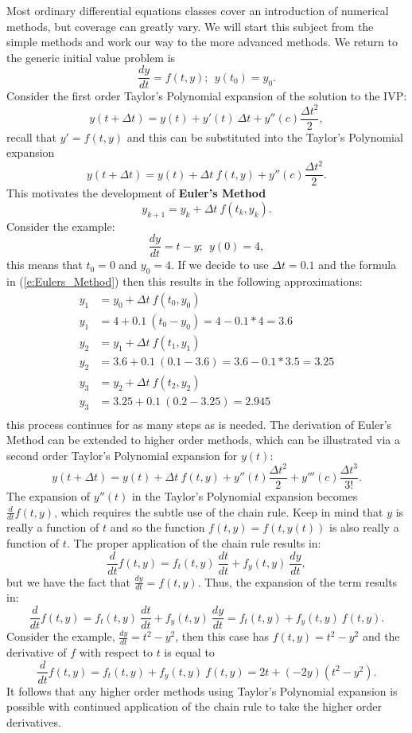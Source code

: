 \documentclass[twoside]{article}
\def\ds{\displaystyle}
\begin{document}
Most ordinary differential equations classes cover an introduction of numerical methods, but coverage can greatly vary. We will start this subject from the simple methods and work our way to the more advanced methods. We return to the generic initial value problem is 
$$\frac {dy}{dt} = f(t,y); \ \ y(t_0)=y_0.$$
Consider the first order Taylor's Polynomial expansion of the solution to the IVP:
\begin{equation}
y(t+\Delta t) = y(t) + y'(t) \ \Delta t + y''(c) \frac {\Delta t^2}2,
\label{e:firststepEuler}
\end{equation}
recall that $\ds y'=f(t,y)$ and this can be substituted into the Taylor's Polynomial expansion
$$y(t+\Delta t) = y(t) + \Delta t \ f(t,y) + y''(c) \frac {\Delta t^2}2.$$
This motivates the development of {\bf Euler's Method}
\begin{equation}
    y_{k+1} = y_k + \Delta t \ f(t_k,y_k). 
    \label{e:Eulers_Method}
\end{equation}
Consider the example:
$$\frac {dy}{dt} = t-y; \ \ y(0)=4,$$
this means that $t_0 = 0$ and $\ds y_0 = 4$. If we decide to use $\ds \Delta t= 0.1$ and the formula in (\ref{e:Eulers_Method}) then this results in the following approximations:
\begin{align*}
    y_1 &= y_0 + \Delta t \ f(t_0,y_0) \\
    y_1 &= 4 + 0.1 \ (t_0-y_0) = 4-0.1*4 = 3.6\\
    y_2 &= y_1 + \Delta t \ f(t_1,y_1) \\
    y_2 &= 3.6 + 0.1 \ (0.1-3.6) = 3.6-0.1*3.5 = 3.25\\
    y_3 &= y_2 + \Delta t \ f(t_2,y_2) \\
    y_3 &= 3.25 + 0.1 \ (0.2-3.25) = 2.945\\    
\end{align*}
this process continues for as many steps as is needed. The derivation of Euler's Method can be extended to higher order methods, which can be illustrated via a second order Taylor's Polynomial expansion for $y(t)$:
$$y(t+\Delta t) = y(t) + \Delta t \ f(t,y) + y''(t) \frac {\Delta t^2}2 + y'''(c) \frac {\Delta t^3}{3!}.$$
The expansion of $\ds y''(t)$ in the Taylor's Polynomial expansion becomes $\ds \frac {d}{dt}f(t,y)$, which requires the subtle use of the chain rule. Keep in mind that $y$ is really a function of $t$ and so the function $\ds f(t,y) = f(t,y(t))$ is also really a function of $t$. The proper application of the chain rule results in:
$$\frac {d}{dt}f(t,y) = f_t(t,y) \ \frac {dt}{dt} + f_y(t,y) \ \frac {dy}{dt}, $$
but we have the fact that $\ds \frac {dy}{dt} = f(t,y)$. Thus, the expansion of the term results in:
$$\frac {d}{dt}f(t,y) = f_t(t,y) \ \frac {dt}{dt} + f_y(t,y) \ \frac {dy}{dt}= f_t(t,y) + f_y(t,y) \ f(t,y). $$
Consider the example, $\ds \frac {dy}{dt} = t^2-y^2$, then this case has $\ds f(t,y) = t^2-y^2$ and the derivative of $f$ with respect to $t$ is equal to
$$\frac {d}{dt}f(t,y) =  f_t(t,y) + f_y(t,y) \ f(t,y) = 2t + (-2y)(t^2-y^2). $$
It follows that any higher order methods using Taylor's Polynomial expansion is possible with continued application of the chain rule to take the higher order derivatives. 
\end{document}

